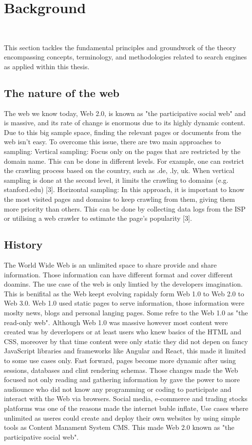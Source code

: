 \chapter{Background}\
\label{chap:background}

This section tackles the fundamental principles and groundwork of the theory encompassing concepts, terminology, and methodologies related to search engines as applied within this thesis.

\section{The nature of the web}
The web we know today, Web 2.0, is known as "the participative social web" and is massive, and its rate of change is enormous due to its highly dynamic content. Due to this big sample space, finding the relevant pages or documents from the web isn't easy. To overcome this issue, there are two main approaches to sampling: 
Vertical sampling: Focus only on the pages that are restricted by the domain name. This can be done in different levels. For example, one can restrict the crawling process based on the country, such as .de, .ly, uk. When vertical sampling is done at the second level, it limits the crawling to domains (e.g. stanford.edu) [3].
Horizontal sampling: In this approach, it is important to know the most visited pages and domains to keep crawling from them, giving them more priority than others. This can be done by collecting data logs from the ISP or utilising a web crawler to estimate the page's popularity [3]. 


\section{History}

The World Wide Web is an unlimited space to share provide and share information. Those information can have different format and cover different doamins. The use case of the web is only limtied by the developers imagination. This is benifital as the Web keept evolving rapidaly form Web 1.0 to Web 2.0 to Web 3.0. Web 1.0 used static pages to serve information, those information were moslty news, blogs and personal langing pages. Some refre to the Web 1.0 as "the read-only web". Although Web 1.0 was massive however most content were created was by deverlopers or at least users who knew basics of the HTML and CSS, moreover by that time content were only static they did not depen on fancy JavaScript libraries and frameworks like Angular and React, this made it limited to some use cases only. Fast forward, pages become more dynamic after using sessions, databases and clint rendering schemas. Those changes made the Web focused not only reading and gathering information by gave the power to more audiounce who did not know any programming or coding to participate and interact with the Web via browsers. Social media, e-commerce and trading stocks platforms was one of the reasons made the internet buble inflate, Use cases where unlimited as useres could create and deploy their own websites by using simple tools as Content Manament System CMS. This made Web 2.0 known as "the participative social web".

